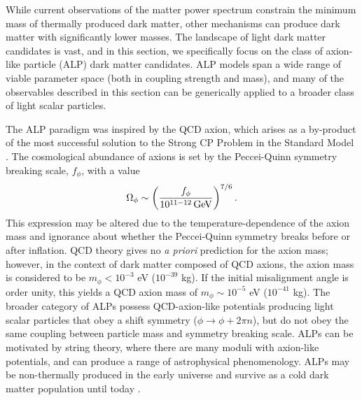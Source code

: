While current observations of the matter power spectrum constrain the minimum mass of thermally produced dark matter, other mechanisms can  produce dark matter with significantly lower masses. The landscape of light dark matter candidates is vast, and in this section, we specifically focus on the class of axion-like particle (ALP) dark matter candidates.
ALP models span a wide range of viable parameter space (both in coupling strength and mass), and many of the observables described in this section can be generically applied to a broader class of light scalar particles.

The ALP paradigm was inspired by the QCD axion, which arises as a by-product of the most successful solution to the Strong CP Problem in the Standard Model \citep{PecceiQuinn:1977}. 
The cosmological abundance of axions is set by the Peccei-Quinn symmetry breaking scale, $f_\phi$, with a value
\begin{equation}
\Omega_\phi\sim\left(\frac{f_\phi}{10^{11-12}\,{\rm GeV}}\right)^{7/6}.
\end{equation}
This expression may be altered due to the temperature-dependence of the axion mass and ignorance about whether the Peccei-Quinn symmetry breaks before or after inflation. 
QCD theory gives no {\it a priori} prediction for the axion mass; however, in the context of dark matter composed of QCD axions, the axion mass is considered to be $m_\phi< 10^{-3}$ eV ($10^{-39}$ kg). 
If the initial misalignment angle is order unity, this yields a QCD axion mass of $m_\phi \sim 10^{-5}$ eV ($10^{-41}$ kg).
The broader category of ALPs possess QCD-axion-like potentials producing light scalar particles that obey a shift symmetry ($\phi \rightarrow \phi + 2\pi n$), but do not obey the same coupling between particle mass and symmetry breaking scale. 
ALPs can be motivated by string theory, where there are many moduli with axion-like potentials, and can produce a range of astrophysical phenomenology.
ALPs may be non-thermally produced in the early universe and survive as a cold dark matter population until today \citep[\eg][]{Arias:2012az}.


